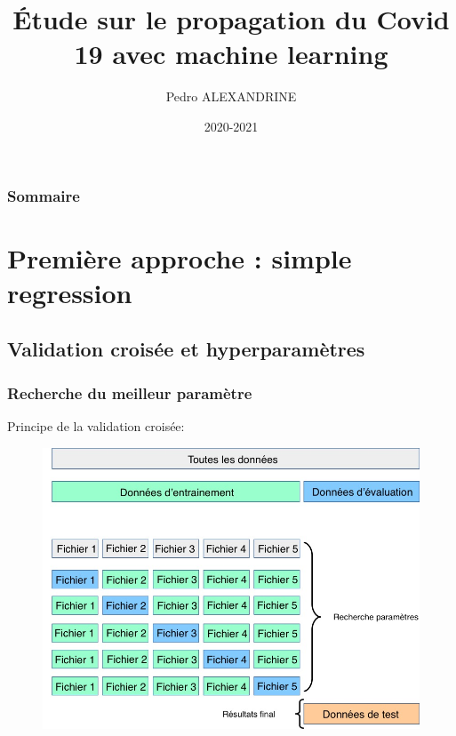 \documentclass{beamer}
\title{Étude sur le propagation du Covid 19 avec machine learning}
\date{2020-2021}
\institute{numero d'inscription : 41758}
\author{Pedro ALEXANDRINE}
\begin{document}
\begin{frame}
	\maketitle
\end{frame}

\begin{frame}
	\frametitle{Sommaire}
	\tableofcontents
\end{frame}
\section{Première approche : simple regression}
\subsection{Validation croisée et hyperparamètres}
\begin{frame}
	\frametitle{Recherche du meilleur paramètre}
	Principe de la  validation croisée:
	\begin{figure}[b]
		\centering
		\includegraphics[scale=0.27]{gscv}
	\end{figure}
\end{frame}
\end{document}
